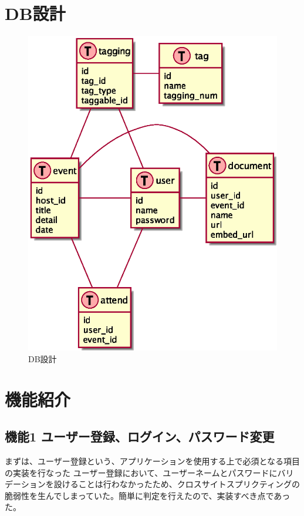 \documentclass[11pt,a4j]{jsarticle}
\makeatletter
\newcommand{\figcaption}[1]{\def\@captype{figure}\caption{#1}}
\makeatother
\begin{document}


\section{DB設計}

\begin{figure}[H]
  \centering
  \includegraphics[scale=0.7]{img/data.eps}
  \figcaption{DB設計}
  \label{fig:db}
\end{figure}


\section{機能紹介}

\subsection{機能1 ユーザー登録、ログイン、パスワード変更}

まずは、ユーザー登録という、アプリケーションを使用する上で必須となる項目の実装を行なった
ユーザー登録において、ユーザーネームとパスワードにバリデーションを設けることは行わなかったため、クロスサイトスプリクティングの
脆弱性を生んでしまっていた。簡単に判定を行えたので、実装すべき点であった。
\end{document}
